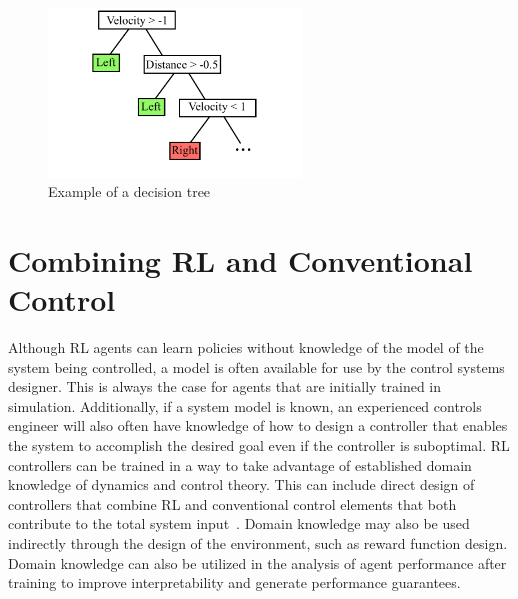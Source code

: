 %
\begin{figure}[tb]
\begin{center}
\includegraphics[width = 0.6\textwidth]{figures/figures_introduction/Decision_tree.pdf}
\caption{Example of a decision tree}
\label{fig_chap1:decision_tree}
\end{center}
\end{figure}
%

\section{Combining RL and Conventional Control}
\label{sec:combined_control_overview}

Although RL agents can learn policies without knowledge of the model of the system being controlled, a model is often available for use by the control systems designer. This is always the case for agents that are initially trained in simulation. Additionally, if a system model is known, an experienced controls engineer will also often have knowledge of how to design a controller that enables the system to accomplish the desired goal even if the controller is suboptimal.
%
RL controllers can be trained in a way to take advantage of established domain knowledge of dynamics and control theory. This can include direct design of controllers that combine RL and conventional control elements that both contribute to the total system input~\cite{Eaglin:2020a,Eaglin:2023a}. Domain knowledge may also be used indirectly through the design of the environment, such as reward function design. Domain knowledge can also be utilized in the analysis of agent performance after training to improve interpretability and generate performance guarantees. 

